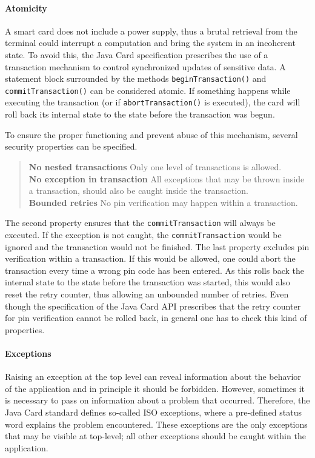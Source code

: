 \paragraph {Atomicity}

A smart card does not include a power supply, thus a brutal retrieval
from the terminal could interrupt a computation and bring the system in
an incoherent state. To avoid this, the Java Card
specification prescribes the use of a transaction mechanism to
control synchronized updates of sensitive data. A 
statement block surrounded by the methods \texttt{beginTransaction()} and
\texttt{commitTransaction()} can be considered atomic.
If something happens while executing the transaction (or if
\texttt{abortTransaction()} is executed), the card will
roll back its internal state to the state before the transaction was
begun.

To ensure the proper functioning and prevent abuse of this mechanism,
several security properties can be specified.

\begin{quote}
\textbf{No nested transactions} Only one level of transactions
is allowed.\smallskip\\
\textbf{No exception in transaction} All exceptions that may be thrown
inside a transaction, should also be caught inside the
transaction.\smallskip\\
\textbf{Bounded retries}
No pin verification may happen within a transaction.
\end{quote} 
The second property ensures that the \texttt{commitTransaction} will
always be executed. If the exception is not caught, the
\texttt{commitTransaction} would be ignored and the transaction would
not be finished. The last property excludes pin verification within a
transaction. If this would be allowed, one could abort the transaction
every time a wrong pin code has been entered. As this rolls
back the internal state to the state before the transaction was
started, this would also reset the retry counter, thus allowing an
unbounded number of retries. Even though the specification of the Java
Card API prescribes that the retry counter for pin verification cannot
be rolled back, in general one has to check this kind of properties.

\paragraph{Exceptions}

Raising an exception at the top level can reveal
information about the behavior of the application and in principle it
should be forbidden. However, sometimes it is necessary to pass on
information about a problem that occurred. Therefore, the Java
Card standard defines so-called ISO exceptions, where a pre-defined
status word explains the problem encountered. These exceptions are the
only exceptions that may be visible at top-level; all other exceptions
should be caught within the application.


